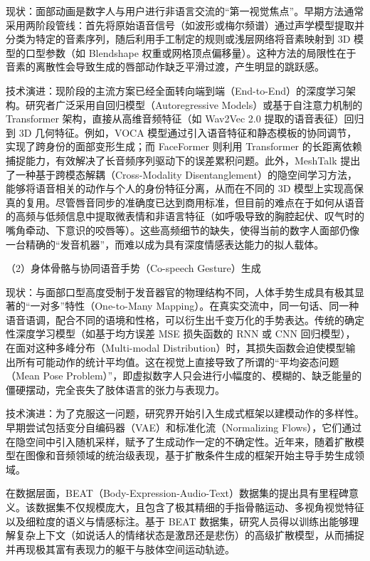 \documentclass[UTF8]{ctexart}
\begin{document}
现状：面部动画是数字人与用户进行非语言交流的``第一视觉焦点''。早期方法通常采用两阶段管线：首先将原始语音信号（如波形或梅尔频谱）通过声学模型提取并分类为特定的音素序列，随后利用手工制定的规则或浅层网络将音素映射到
3D 模型的口型参数（如 Blendshape
权重或网格顶点偏移量）。这种方法的局限性在于音素的离散性会导致生成的唇部动作缺乏平滑过渡，产生明显的跳跃感。

技术演进：现阶段的主流方案已经全面转向端到端（End-to-End）的深度学习架构。研究者广泛采用自回归模型（Autoregressive
Models）或基于自注意力机制的 Transformer 架构，直接从高维音频特征（如
Wav2Vec 2.0 提取的语音表征）回归到 3D 几何特征。例如，VOCA
模型通过引入语音特征和静态模板的协同调节，实现了跨身份的面部变形生成；而
FaceFormer 则利用 Transformer
的长距离依赖捕捉能力，有效解决了长音频序列驱动下的误差累积问题。此外，MeshTalk
提出了一种基于跨模态解耦（Cross-Modality
Disentanglement）的隐空间学习方法，能够将语音相关的动作与个人的身份特征分离，从而在不同的
3D
模型上实现高保真的复用。尽管唇音同步的准确度已达到商用标准，但目前的难点在于如何从语音的高频与低频信息中提取微表情和非语言特征（如呼吸导致的胸腔起伏、叹气时的嘴角牵动、下意识的咬唇等）。这些高频细节的缺失，使得当前的数字人面部仍像一台精确的``发音机器''，而难以成为具有深度情感表达能力的拟人载体。

（2）身体骨骼与协同语音手势（Co-speech Gesture）生成

现状：与面部口型高度受制于发音器官的物理结构不同，人体手势生成具有极其显著的``一对多''特性（One-to-Many Mapping）。在真实交流中，同一句话、同一种语音语调，配合不同的语境和性格，可以衍生出千变万化的手势表达。传统的确定性深度学习模型（如基于均方误差 MSE 损失函数的 RNN 或 CNN 回归模型），在面对这种多峰分布（Multi-modal Distribution）时，其损失函数会迫使模型输出所有可能动作的统计平均值。这在视觉上直接导致了所谓的``平均姿态问题（Mean Pose Problem）''，即虚拟数字人只会进行小幅度的、模糊的、缺乏能量的僵硬摆动，完全丧失了肢体语言的张力与表现力。

技术演进：为了克服这一问题，研究界开始引入生成式框架以建模动作的多样性。早期尝试包括变分自编码器（VAE）和标准化流（Normalizing
Flows），它们通过在隐空间中引入随机采样，赋予了生成动作一定的不确定性。近年来，随着扩散模型在图像和音频领域的统治级表现，基于扩散条件生成的框架开始主导手势生成领域。

在数据层面，BEAT（Body-Expression-Audio-Text）数据集的提出具有里程碑意义。该数据集不仅规模庞大，且包含了极其精细的手指骨骼运动、多视角视觉特征以及细粒度的语义与情感标注。基于
BEAT
数据集，研究人员得以训练出能够理解复杂上下文（如说话人的情绪状态是激昂还是悲伤）的高级扩散模型，从而捕捉并再现极其富有表现力的躯干与肢体空间运动轨迹。
\end{document}
